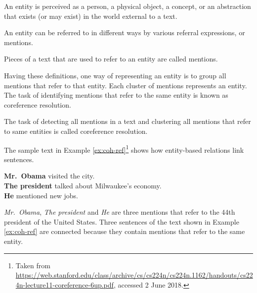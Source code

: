 \begin{definition}
    An entity is perceived as a person, a physical object, a concept, or an abstraction that exists (or may exist) in the world external to a text.  
\end{definition}

An entity can be referred to in different ways by various referral expressions, or mentions. 

\begin{definition}
	Pieces of a text that are used to refer to an entity are called mentions. 
\end{definition}

Having these definitions, one way of representing an entity is to group all mentions that refer to that entity. 
Each cluster of mentions 
represents an entity. 
The task of identifying mentions that refer to the same entity is known as coreference resolution.   

\begin{definition}
	The task of detecting all mentions in a text and clustering all mentions that refer to same entities is called coreference resolution. 
\end{definition}

 
The sample text in Example \ref{ex:coh-ref}\footnote{Taken from \url{https://web.stanford.edu/class/archive/cs/cs224n/cs224n.1162/handouts/cs224n-lecture11-coreference-6up.pdf}, accessed 2 June 2018.} shows how entity-based relations link sentences. 

\begin{examples}
	\label{ex:coh-ref}
	\textbf{Mr.\ Obama} visited the city. \\
	\textbf{The president} talked about Milwaukee’s economy. \\
	\textbf{He} mentioned new jobs. \\
\end{examples} 

\emph{Mr.\ Obama}, \emph{The president} and \emph{He} are three mentions that refer to the 44th president of the United States. 
Three sentences of the text shown in Example \ref{ex:coh-ref} are connected because they contain mentions that refer to the same entity. 

